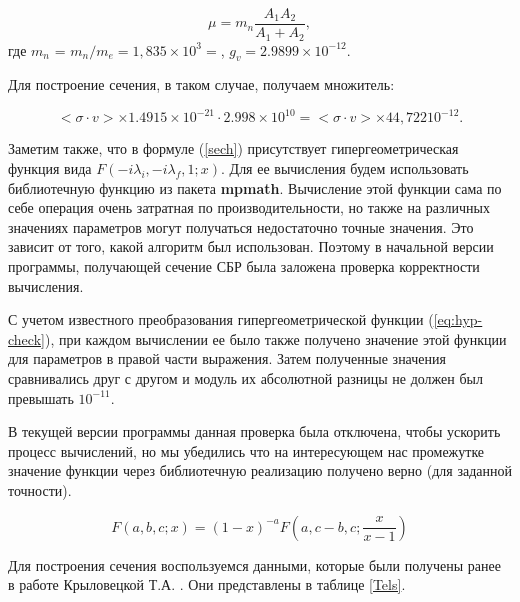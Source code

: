 \documentclass[14pt, a4paper]{article}
\numberwithin{figure}{section}
\numberwithin{equation}{section}
\begin{document}
\begin{equation}
\mu = m_n \frac{A_1 A_2}{A_1 + A_2},
\end{equation}
где $m_n$ =  $m_n/m_e = 1,835\times10^3 =$, $g_v = 2.9899 \times 10^{-12}$.

Для построение сечения, в таком случае, получаем множитель:

$$
	<\sigma \cdot v> \times 1.4915 \times 10^{-21} \cdot 2.998 \times 10^{10} = 	<\sigma \cdot v> \times 44,722 10^{-12}.
$$

Заметим также, что в формуле (\ref{sech}) присутствует гипергеометрическая функция вида $F(-i\lambda_i,-i\lambda_f,1;x)$. Для ее вычисления будем использовать библиотечную функцию из пакета \textbf{mpmath}. Вычисление этой функции сама по себе операция очень затратная по производительности, но также на различных значениях параметров могут получаться недостаточно точные значения. Это зависит от того, какой алгоритм был использован. Поэтому в начальной версии программы, получающей сечение СБР была заложена проверка корректности вычисления. 

С учетом известного преобразования гипергеометрической функции (\ref{eq:hyp-check}), при каждом вычислении ее было также получено значение этой функции для параметров в правой части выражения. Затем полученные значения сравнивались друг с другом и модуль их абсолютной разницы не должен был превышать $10^{-11}$. 

В текущей версии программы данная проверка была отключена, чтобы ускорить процесс вычислений, но мы убедились что на интересующем нас промежутке значение функции через библиотечную реализацию получено верно (для заданной точности).

\begin{equation}
\label{eq:hyp-check}
F(a,b,c;x) = (1-x)^{-a}F\left(a,c-b,c; \frac{x}{x-1}\right)
\end{equation}

Для построения сечения воспользуемся данными, которые были получены ранее в работе Крыловецкой Т.А. \cite{tak}. Они представлены в таблице \ref{Tels}.
\end{document}
